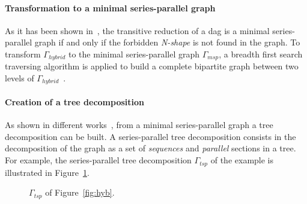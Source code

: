 \paragraph{Transformation to a minimal series-parallel graph} As it has been shown in~\cite{Valdes:1979:RSP:800135.804393}, the transitive reduction of a dag is a minimal series-parallel graph if and only if the forbidden \emph{N-shape} is not found in the graph. To transform $\Gamma_{hybrid}$ to the minimal series-parallel graph $\Gamma_{msp}$, a breadth first search~\cite{} traversing algorithm is applied to build a complete bipartite graph between two levels of $\Gamma_{hybrid}$~\cite{Mitchell:2004:CMV:1082101.1082117}.

\paragraph{Creation of a tree decomposition} As shown in different works~\cite{Valdes:1979:RSP:800135.804393,Schoenmakers95anew}, from a minimal series-parallel graph a tree decomposition can be built. A series-parallel tree decomposition consists in the decomposition of the graph as a set of \emph{sequences} and \emph{parallel} sections in a tree. For example, the series-parallel tree decomposition $\Gamma_{tsp}$ of the example is illustrated in Figure~\ref{fig:canon}.

\begin{figure}[h!]
\begin{center}
\caption{$\Gamma_{tsp}$ of Figure~\ref{fig:hyb}.}
\label{fig:canon}
\end{center}
\end{figure}

